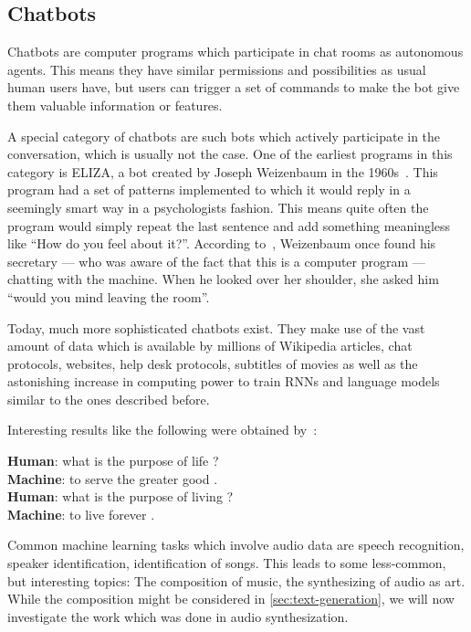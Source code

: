 \documentclass[technote,a4paper,leqno]{IEEEtran}
\begin{document}
\subsection{Chatbots}%

Chatbots are computer programs which participate in chat rooms as autonomous
agents. This means they have similar permissions and possibilities as usual human
users have, but users can trigger a set of commands to make the bot give them
valuable information or features.

A special category of chatbots are such bots which actively participate in the
conversation, which is usually not the case. One of the earliest programs in
this category is ELIZA, a bot created by Joseph Weizenbaum in the
1960s~\cite{Weizenbaum1976}. This program had a set of patterns implemented to
which it would reply in a seemingly smart way in a psychologists fashion. This
means quite often the program would simply repeat the last sentence and add
something meaningless like \enquote{How do you feel about it?}. According
to~\cite{Curtis2014}, Weizenbaum once found his secretary --- who was aware of
the fact that this is a computer program --- chatting with the machine. When he
looked over her shoulder, she asked him \enquote{would you mind leaving the
room}.

Today, much more sophisticated chatbots exist. They make use of the vast amount
of data which is available by millions of Wikipedia articles, chat protocols,
websites, help desk protocols, subtitles of movies as well as the astonishing
increase in computing power to train
\glspl{RNN} and language models similar to the ones described before.

Interesting results like the following were obtained
by~\cite{vinyals2015neural}:
\begin{displayquote}
\textbf{Human}: what is the purpose of life ?\\
\textbf{Machine}: to serve the greater good .\\
\textbf{Human}: what is the purpose of living ?\\
\textbf{Machine}: to live forever .
\end{displayquote}

Common machine learning tasks which involve audio data are speech recognition,
speaker identification, identification of songs. This leads to some
less-common, but interesting topics: The composition of music, the synthesizing
of audio as art. While the composition might be considered in
\cref{sec:text-generation}, we will now investigate the work which was done in
audio synthesization.
\end{document}
